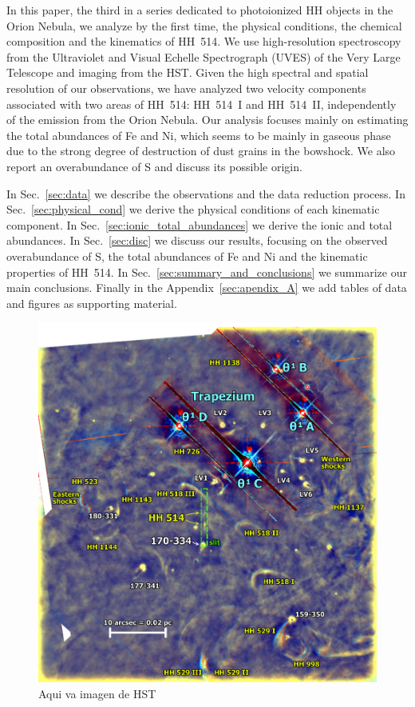 \documentclass[fleqn,usenatbib]{mnras}
\begin{document}
In this paper, the third in a series dedicated to photoionized HH objects in the Orion Nebula, we analyze by the first time, the physical conditions, the chemical composition and the kinematics of HH~514. We use high-resolution spectroscopy from the Ultraviolet and Visual Echelle Spectrograph (UVES) \citep[][]{Dodorico00} of the Very Large Telescope and imaging from the HST. Given the high spectral and spatial resolution of our observations, we have analyzed two velocity components associated with two areas of HH~514: HH~514~I and HH~514~II, independently of the emission from the Orion Nebula. Our analysis focuses mainly on estimating the total abundances of Fe and Ni, which seems to be mainly in gaseous phase due to the strong degree of destruction of dust grains in the bowshock. We also report an overabundance of S and discuss its possible origin.

In Sec.~\ref{sec:data} we describe the observations and the data reduction process. In Sec.~\ref{sec:physical_cond} we derive the physical conditions of each kinematic component. In Sec.~\ref{sec:ionic_total_abundances} we derive the ionic and total abundances. In Sec.~\ref{sec:disc} we discuss our results, focusing on the observed overabundance of S, the total abundances of Fe and Ni and the kinematic properties of HH~514. In Sec.~\ref{sec:summary_and_conclusions} we summarize our main conclusions. Finally in the Appendix~\ref{sec:apendix_A} we add tables of data
and figures as supporting material.



\begin{figure}
\includegraphics[width=\textwidth]{hh514-finding}
\caption{Aqui va imagen de HST}
\label{fig:hst}
\end{figure} 
\end{document}
